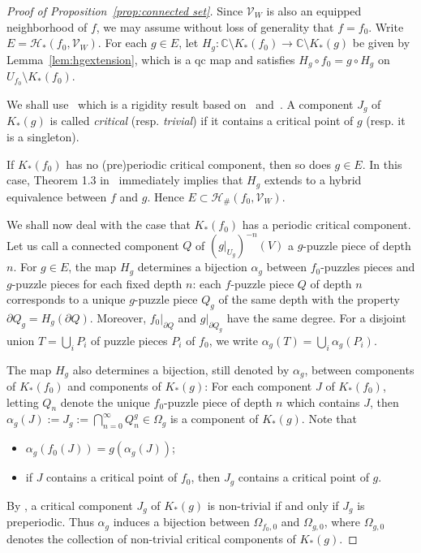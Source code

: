 \documentclass{amsart}
\numberwithin{equation}{section}
\newcommand{\C}{\mathbb C}
\theoremstyle{definition}
\theoremstyle{remark}
\begin{document}
\begin{proof}[Proof of Proposition~\ref{prop:connected set}] Since $\mathcal{V}_W$ is also an equipped neighborhood of $f$, we may assume without loss of generality that $f=f_0$. Write $E=\mathcal{H}_*(f_0,\mathcal{V}_W)$.  
For each $g\in E$, let $H_g:\C\setminus K_*(f_0)\to \C\setminus K_*(g)$ be given by Lemma~\ref{lem:hgextension}, which is a qc map and satisfies $H_g\circ f_0=g\circ H_g$ on $U_{f_0}\setminus K_*(f_0)$.  


We shall use~\cite[Theorem 1.3]{PT} which is a rigidity result based on~\cite{KSS} and~\cite{KL}.   
A component $J_g$ of $K_*(g)$ is called {\em critical} (resp. {\em trivial}) if it contains a critical point of $g$ (resp. it is a singleton). 

If $K_*(f_0)$ has no (pre)periodic critical component, then so does $g\in E$. In this case, Theorem 1.3 in~\cite{PT} immediately implies that $H_g$ extends to a hybrid equivalence between $f$ and $g$. Hence $E\subset \mathcal{H}_\#(f_0, \mathcal{V}_W)$.


We shall now deal with the case that $K_*(f_0)$ has a periodic critical component.
Let us call a connected component $Q$ of $(g|_{U_g})^{-n}(V)$ a $g$-puzzle piece of depth $n$. For $g\in E$, the map $H_g$ determines a bijection $\alpha_g$ between $f_0$-puzzles pieces and $g$-puzzle pieces for each fixed depth $n$: each $f$-puzzle piece $Q$ of depth $n$ corresponds to a unique $g$-puzzle piece $Q_g$ of the same depth with the property $\partial Q_g=H_g(\partial Q)$. Moreover, $f_0|_{\partial Q}$ and $g|_{\partial Q_g}$ have the same degree.  For a disjoint union $T=\bigcup_i P_i$ of puzzle pieces $P_i$ of $f_0$, we write $\alpha_g(T)=\bigcup_i \alpha_g(P_i)$.

The map $H_g$ also determines a bijection, still denoted by $\alpha_g$, between components of $K_*(f_0)$ and components of $K_*(g)$: For each component $J$ of $K_*(f_0)$, letting $Q_n$ denote the unique $f_0$-puzzle piece of depth $n$ which contains $J$, then $\alpha_g(J):=J_g:=\bigcap_{n=0}^\infty Q_n^g\in \Omega_g$ is a component of $K_*(g)$. Note that 
\begin{itemize}
\item $\alpha_g(f_0(J))=g(\alpha_g(J))$;
\item if $J$ contains a critical point of $f_0$, then $J_g$ contains a critical point of $g$. 
\end{itemize}
By \cite{QY,KvS}, a critical component $J_g$ of $K_*(g)$ is non-trivial if and only if $J_g$ is preperiodic. Thus $\alpha_g$ induces a bijection between $\Omega_{f_0,0}$ and $\Omega_{g,0}$, where $\Omega_{g,0}$ denotes the collection of non-trivial critical components of $K_*(g)$.


\end{proof}
\end{document}
